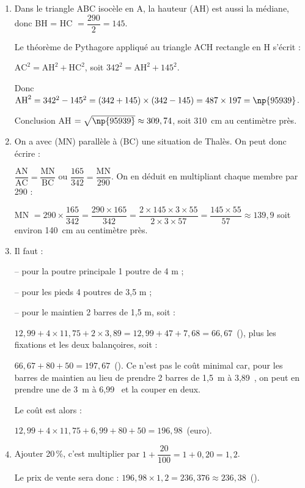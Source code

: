 \documentclass[10pt]{article}
\newcommand{\euro}{\eurologo{}}
\begin{document}
\begin{enumerate}
\item Dans le triangle ABC isocèle en A, la hauteur (AH) est aussi la médiane, donc BH = HC $= \dfrac{290}{2} = 145$.

Le théorème de Pythagore appliqué au triangle ACH rectangle en H s'écrit :

$\text{AC}^2 = \text{AH}^2 + \text{HC}^2$, soit $342^2 = \text{AH}^2 + 145^2$.

Donc $\text{AH}^2 = 342^2 - 145^2 = (342 + 145)\times (342 - 145) = 487 \times 197 = \np{95939}$.

Conclusion AH $ = \sqrt{\np{95939}} \approx 309,74$, soit 310~cm au centimètre près.
\item 
On a avec (MN) parallèle à (BC) une situation de Thalès. On peut donc écrire :

$\dfrac{\text{AN}}{\text{AC}} = \dfrac{\text{MN}}{\text{BC}}$ ou $\dfrac{165}{342} = \dfrac{\text{MN}}{290}$. On en déduit en multipliant chaque membre par 290 :

MN $ = 290 \times \dfrac{165}{342} = \dfrac{290 \times 165}{342} = \dfrac{2 \times 145 \times 3 \times 55}{2 \times 3 \times 57} = \dfrac{145 \times 55}{57} \approx 139,9$ soit environ 140~cm au centimètre près.
\item %
Il faut :

-- pour la poutre principale 1 poutre de 4 m ;

-- pour les pieds 4 poutres de 3,5 m ;

-- pour le maintien 2 barres de 1,5 m, soit :

$12,99 + 4 \times 11,75 + 2 \times 3,89 = 12,99 + 47 + 7,68 = 66,67$~(\euro), plus les fixations et les deux balançoires, soit :

$66,67 + 80 + 50 = 197,67$~(\euro).
Ce n'est pas le coût minimal car, pour les barres de maintien au lieu de prendre 2 barres de 1,5~m à 3,89~\euro{}, on peut en prendre une de 3~m à 6,99~\euro{} et la couper en deux.

Le coût est alors : 

$12,99 + 4 \times 11,75 +  6,99 + 80 + 50 = 196,98$~(euro).
\item Ajouter 20\,\%, c'est multiplier par $1 + \dfrac{20}{100} = 1 + 0,20 = 1,2$.

Le prix de vente sera donc : $196,98 \times 1,2 = 236,376 \approx 236,38$~(\euro).

\end{enumerate}
\end{document}
